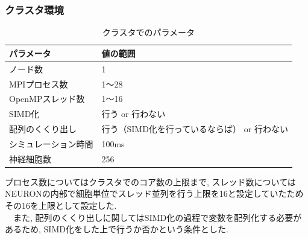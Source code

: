 \subsubsection{クラスタ環境}
\begin{table}[htb]
  \caption {クラスタでのパラメータ}
  \begin{center}
    \begin{tabular}{|p{6cm}|p{8cm}|}
      \hline
      パラメータ & 値の範囲\\ \hline
      ノード数 & 1\\ \hline
      MPIプロセス数 & 1〜28\\ \hline
      OpenMPスレッド数 & 1〜16\\ \hline
      SIMD化 & 行う or 行わない\\ \hline
      配列のくくり出し & 行う（SIMD化を行っているならば） or 行わない\\ \hline
      シミュレーション時間 & 100ms\\ \hline
      神経細胞数 & 256\\ \hline
    \end{tabular}
  \end{center}
\end{table}
プロセス数についてはクラスタでのコア数の上限まで,
スレッド数についてはNEURONの内部で細胞単位でスレッド並列を行う上限を16と設定していたためその16を上限として設定した.\\
　また, 配列のくくり出しに関してはSIMD化の過程で変数を配列化する必要があるため, SIMD化をした上で行うか否かという条件とした.\\

